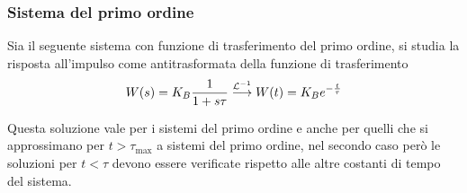 \subsubsection{Sistema del primo ordine}
Sia il seguente sistema con funzione di trasferimento del primo ordine, si
studia la risposta all'impulso come antitrasformata della funzione di
trasferimento
$$
W(s) = K_B \frac{1}{1+s\tau} \stackrel{\mathcal{L}^{-1}}{\longrightarrow} W(t) = K_B
e^{-\frac{t}{\tau}}
$$
\begin{figure}[h]
 \centering
\end{figure}
Questa soluzione vale per i sistemi del primo ordine e anche per quelli che si
approssimano per $t>\tau_{\text{max}}$ a sistemi del primo ordine, nel secondo
caso però le soluzioni per $t<\tau$ devono essere verificate rispetto alle
altre costanti di tempo del sistema.
